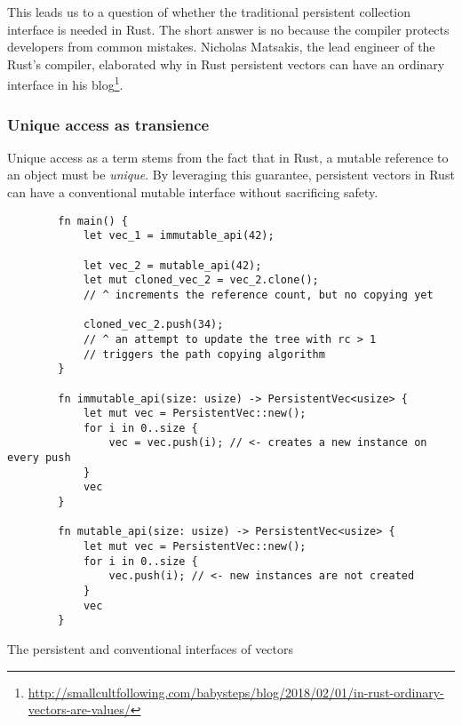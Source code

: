This leads us to a question of whether the traditional persistent collection interface is needed in Rust. The short answer is no because the compiler protects developers from common mistakes. Nicholas Matsakis, the lead engineer of the Rust's compiler, elaborated why in Rust persistent vectors can have an ordinary interface in his blog\footnote{\url{http://smallcultfollowing.com/babysteps/blog/2018/02/01/in-rust-ordinary-vectors-are-values/}}.

\subsubsection*{Unique access as transience}
Unique access as a term stems from the fact that in Rust, a mutable reference to an object must be \emph{unique}. By leveraging this guarantee, persistent vectors in Rust can have a conventional mutable interface without sacrificing safety.

\begin{listing}[!ht]

    \centering
    \begin{verbatim}
        fn main() {
            let vec_1 = immutable_api(42);

            let vec_2 = mutable_api(42);
            let mut cloned_vec_2 = vec_2.clone();
            // ^ increments the reference count, but no copying yet

            cloned_vec_2.push(34);
            // ^ an attempt to update the tree with rc > 1
            // triggers the path copying algorithm
        }

        fn immutable_api(size: usize) -> PersistentVec<usize> {
            let mut vec = PersistentVec::new();
            for i in 0..size {
                vec = vec.push(i); // <- creates a new instance on every push
            }
            vec
        }

        fn mutable_api(size: usize) -> PersistentVec<usize> {
            let mut vec = PersistentVec::new();
            for i in 0..size {
                vec.push(i); // <- new instances are not created
            }
            vec
        }
    \end{verbatim}

    \caption{The persistent and conventional interfaces of vectors}
    \label{lst:conventional-interface}
\end{listing}

